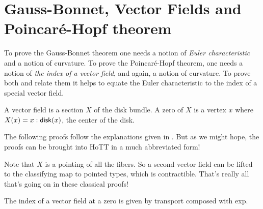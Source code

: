 \section{Gauss-Bonnet, Vector Fields and Poincaré-Hopf theorem}

To prove the Gauss-Bonnet theorem one needs a notion of \emph{Euler characteristic} and a notion of curvature. To prove the Poincaré-Hopf theorem, one needs a notion of \emph{the index of a vector field}, and again, a notion of curvature. To prove both and relate them it helps to equate the Euler characteristic to the index of a special vector field. 

\begin{mydef}
A vector field is a section \( X \) of the disk bundle. A zero of \( X \) is a vertex \( x \) where \( X(x)=x:\mathsf{disk}(x) \), the center of the disk.
\end{mydef}

The following proofs follow the explanations given in \cite{needham}. But as we might hope, the proofs can be brought into HoTT in a much abbreviated form!

Note that \( X \) is a pointing of all the fibers. So a second vector field can be lifted to the classifying map to pointed types, which is contractible. That's really all that's going on in these classical proofs!

\begin{mydef}
The index of a vector field at a zero is given by transport composed with exp.
\end{mydef}

\begin{mydef}

\end{mydef}



